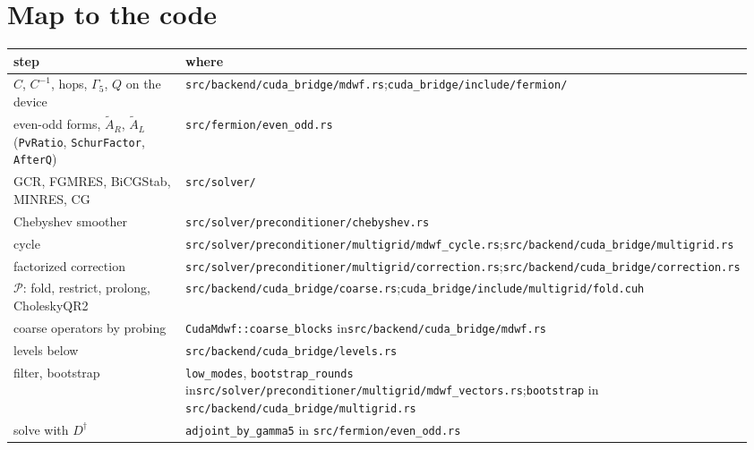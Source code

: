 \documentclass[11pt,a4paper]{article}
\numberwithin{equation}{section}
\newcommand{\dg}{^{\dagger}}
\newcommand{\Gfive}{\Gamma_5}
\newcommand{\AR}{\tilde A_{R}}
\newcommand{\AL}{\tilde A_{L}}
\newcommand{\Pro}{\mathcal P}
\newcommand{\code}[1]{\texttt{\small #1}}
\begin{document}
\section{Map to the code}
\begin{center}
\small
\begin{tabular}{@{}p{0.36\linewidth}p{0.6\linewidth}@{}}
\toprule
step & where\\
\midrule
$C$, $C^{-1}$, hops, $\Gfive$, $Q$ on the device & \code{src/backend/cuda\_bridge/mdwf.rs};\newline \code{cuda\_bridge/include/fermion/}\\
even-odd forms, $\AR$, $\AL$ (\code{PvRatio}, \code{SchurFactor}, \code{AfterQ}) & \code{src/fermion/even\_odd.rs}\\
GCR, FGMRES, BiCGStab, MINRES, CG & \code{src/solver/}\\
Chebyshev smoother & \code{src/solver/preconditioner/chebyshev.rs}\\
cycle & \code{src/solver/preconditioner/multigrid/mdwf\_cycle.rs};\newline \code{src/backend/cuda\_bridge/multigrid.rs}\\
factorized correction & \code{src/solver/preconditioner/multigrid/correction.rs};\newline \code{src/backend/cuda\_bridge/correction.rs}\\
$\Pro$: fold, restrict, prolong, CholeskyQR2 & \code{src/backend/cuda\_bridge/coarse.rs};\newline \code{cuda\_bridge/include/multigrid/fold.cuh}\\
coarse operators by probing & \code{CudaMdwf::coarse\_blocks} in\newline \code{src/backend/cuda\_bridge/mdwf.rs}\\
levels below & \code{src/backend/cuda\_bridge/levels.rs}\\
filter, bootstrap & \code{low\_modes}, \code{bootstrap\_rounds} in\newline \code{src/solver/preconditioner/multigrid/mdwf\_vectors.rs};\newline \code{bootstrap} in \code{src/backend/cuda\_bridge/multigrid.rs}\\
solve with $D\dg$ & \code{adjoint\_by\_gamma5} in \code{src/fermion/even\_odd.rs}\\
\bottomrule
\end{tabular}
\end{center}
\end{document}
